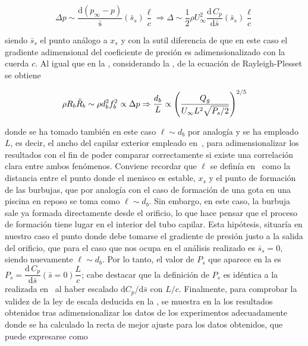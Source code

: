 \begin{equation}
\Delta p \sim \dfrac{\mathrm{d}\left(p_{\infty}-p\right)}{\mathrm{\bar{s}}}\left(\bar{s}_{s}\right)\dfrac{\ell}{c} \Rightarrow \Delta \sim \dfrac{1}{2}\rho U_{\infty}^{2} \dfrac{\mathrm{d}\,C_{p}}{\mathrm{d}\bar{s}}\left(\bar{s}_{s}\right)\dfrac{\ell}{c}
\end{equation}

siendo $\bar{s}_{s}$ el punto análogo a $x_{s}$ y con la sutil diferencia de que en este caso el gradiente adimensional del coeficiente de presión es adimensionalizado con la cuerda $c$. Al igual que en la , considerando la , de la ecuación de Rayleigh-Plesset se obtiene

\begin{equation}
\rho R_{b}\ddot{R}_{b} \sim \rho d_{b}^{2}f_{b}^{2} \propto \Delta p \Rightarrow \dfrac{d_{b}}{L} \propto \left(\dfrac{Q_{g}}{U_{\infty}L^{2}\sqrt{P_{s}/2}}\right)^{2/5}
\LABEQ{escaladoFinal2D}
\end{equation}

donde se ha tomado también en este caso $\ell \sim d_{b}$ por analogía y se ha empleado $L$, es decir, el ancho del capilar exterior empleado en~\cite{Evangelio2015}, para adimensionalizar los resultados con el fin de poder comparar correctamente si existe una correlación clara entre ambos fenómenos. Conviene recordar que $\ell$ se definía en~\cite{Evangelio2015} como la distancia entre el punto donde el menisco es estable, $x_{s}$ y el punto de formación de las burbujas, que por analogía con el caso de formación de una gota en una piscina en reposo se toma como $\ell \sim d_{b}$. Sin embargo, en este caso, la burbuja sale ya formada directamente desde el orificio, lo que hace pensar que el proceso de formación tiene lugar en el interior del tubo capilar. Esta hipótesis, situaría en nuestro caso el punto donde debe tomarse el gradiente de presión justo a la salida del orificio, que para el caso que nos ocupa en el análisis realizado es $\bar{s}_{s} = 0$, siendo nuevamente $\ell \sim d_{b}$. Por lo tanto, el valor de $P_{s}$ que aparece en la  es $P_{s} = \dfrac{\mathrm{d}\,C_{p}}{\mathrm{d}\bar{s}}\left(\bar{s}=0\right)\dfrac{L}{c}$; cabe destacar que la definición de $P_{s}$ es idéntica a la realizada en~\cite{Evangelio2015} al haber escalado $\mathrm{d}C_{p}/\mathrm{d}\bar{s}$ con $L/c$. Finalmente, para comprobar la validez de la ley de escala deducida en la , se muestra en la  los resultados obtenidos tras adimensionalizar los datos de los experimentos adecuadamente donde se ha calculado la recta de mejor ajuste para los datos obtenidos, que puede expresarse como 

